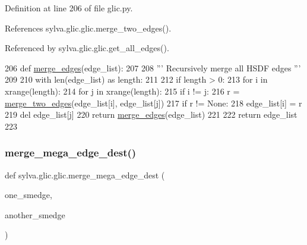 Definition at line 206 of file glic.\+py.



References sylva.\+glic.\+glic.\+merge\+\_\+two\+\_\+edges().



Referenced by sylva.\+glic.\+glic.\+get\+\_\+all\+\_\+edges().


\begin{DoxyCode}
206   \textcolor{keyword}{def }\hyperlink{namespacesylva_1_1glic_1_1glic_aaac34d7c86749beb842e5be3f547d1ec}{merge\_edges}(edge\_list):
207 
208     \textcolor{stringliteral}{''' Recursively merge all HSDF edges '''}
209 
210     with len(edge\_list) \textcolor{keyword}{as} length:
211 
212       \textcolor{keywordflow}{if} length > 0:
213         \textcolor{keywordflow}{for} i \textcolor{keywordflow}{in} xrange(length):
214           \textcolor{keywordflow}{for} j \textcolor{keywordflow}{in} xrange(length):
215             \textcolor{keywordflow}{if} i != j:
216               r = \hyperlink{namespacesylva_1_1glic_1_1glic_a3230a4ec28a3787a073288b4532675cc}{merge\_two\_edges}(edge\_list[i], edge\_list[j])
217               \textcolor{keywordflow}{if} r != \textcolor{keywordtype}{None}:
218                 edge\_list[i] = r
219                 del edge\_list[j]
220                 \textcolor{keywordflow}{return} \hyperlink{namespacesylva_1_1glic_1_1glic_aaac34d7c86749beb842e5be3f547d1ec}{merge\_edges}(edge\_list)
221 
222     \textcolor{keywordflow}{return} edge\_list
223 
\end{DoxyCode}
\mbox{\label{namespacesylva_1_1glic_1_1glic_a80e6906ee9b3a3c96085594f6dab2f84}} 
\subsubsection{\texorpdfstring{merge\+\_\+mega\+\_\+edge\+\_\+dest()}{merge\_mega\_edge\_dest()}}
{\footnotesize\ttfamily def sylva.\+glic.\+glic.\+merge\+\_\+mega\+\_\+edge\+\_\+dest (\begin{DoxyParamCaption}\item[{}]{one\+\_\+smedge,  }\item[{}]{another\+\_\+smedge }\end{DoxyParamCaption})}

